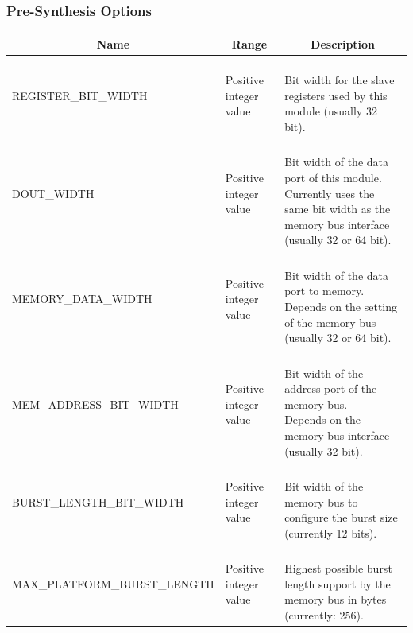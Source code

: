 \subsubsection{Pre-Synthesis Options}

\begin{longtable}[ht]{|l|l|l|}
    \hline
    \multicolumn{1}{|c|}{\textbf{Name}} & \multicolumn{1}{c|}{\textbf{Range}} & \multicolumn{1}{c|}{\textbf{Description}}\\
    \hline
    
    \small{REGISTER\_BIT\_WIDTH} & Positive integer value & \parbox{5cm}{\ \\
        Bit width for the slave registers used by this module (usually 32 bit).\\
    }\\
    \hline
    
    \small{DOUT\_WIDTH} & Positive integer value & \parbox{5cm}{\ \\
        Bit width of the data port of this module.\\
        Currently uses the same bit width as the memory bus interface (usually 32 or 64 bit).\\
    }\\
    \hline
    
    \small{MEMORY\_DATA\_WIDTH} & Positive integer value & \parbox{5cm}{\ \\
        Bit width of the data port to memory.\\
        Depends on the setting of the memory bus (usually 32 or 64 bit).\\
    }\\
    \hline
    
    \small{MEM\_ADDRESS\_BIT\_WIDTH} & Positive integer value & \parbox{5cm}{\ \\
        Bit width of the address port of the memory bus.\\
        Depends on the memory bus interface (usually 32 bit).
    }\\
    \hline
    
    \small{BURST\_LENGTH\_BIT\_WIDTH} & Positive integer value & \parbox{5cm}{\ \\
        Bit width of the memory bus to configure the burst size (currently 12 bits).\\
    }\\
    \hline
    
    \small{MAX\_PLATFORM\_BURST\_LENGTH} & Positive integer value & \parbox{5cm}{\ \\
        Highest possible burst length support by the memory bus in bytes (currently: 256).\\
    }\\
    \hline
    

\end{longtable}
